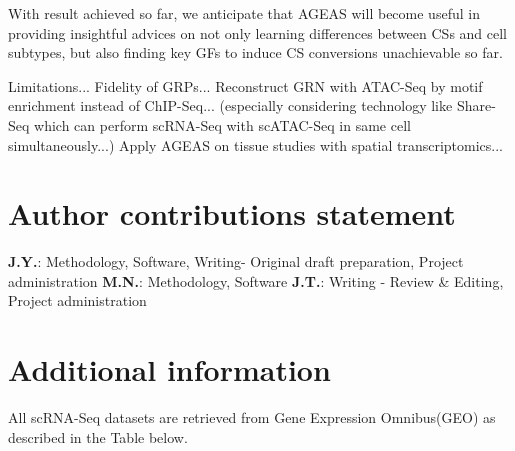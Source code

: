 \documentclass[fleqn,10pt]{wlscirep}
\begin{document}
  With result achieved so far, we anticipate that AGEAS will become useful in providing insightful advices on not only learning differences between CSs and cell subtypes, but also finding key GFs to induce CS conversions unachievable so far.

  Limitations...
  Fidelity of GRPs...
  Reconstruct GRN with ATAC-Seq by motif enrichment instead of ChIP-Seq... (especially considering technology like Share-Seq which can perform scRNA-Seq with scATAC-Seq in same cell simultaneously...)
  Apply AGEAS on tissue studies with spatial transcriptomics...







\section*{Author contributions statement}
\textbf{J.Y.}: Methodology, Software, Writing- Original draft preparation, Project administration
\textbf{M.N.}: Methodology, Software
\textbf{J.T.}: Writing - Review \& Editing, Project administration

\section*{Additional information}
All scRNA-Seq datasets are retrieved from Gene Expression Omnibus(GEO) as described in the Table below.
\end{document}
